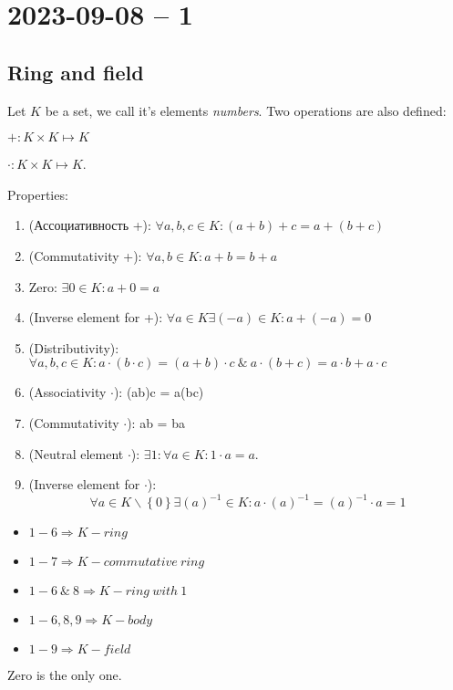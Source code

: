 \section{2023-09-08 -- 1}

\subsection{Ring and field}
Let $K$ be a set, we call it's elements \textit{numbers}. Two operations are also defined:

\(+: K \times K \mapsto K \) 

\(\cdot: K \times K \mapsto K\).

Properties:
\begin{enumerate}
	\item (Ассоциативность +): $\forall a,b,c \in K: (a+b)+c = a + (b+c)$ 
	\item (Commutativity +): $\forall a,b \in K: a + b = b + a$
	\item Zero: $\exists 0 \in K: a+0=a$
	\item (Inverse element for +): $\forall a \in K \exists (-a) \in K: a + (-a) = 0$ 
	\item (Distributivity): $\forall a,b,c \in K: a \cdot (b \cdot c) = (a+b) \cdot c \ \& \  a \cdot (b + c) = a \cdot b + a \cdot c$
	\item (Associativity $\cdot$): (ab)c = a(bc) 
	\item (Commutativity $\cdot$): ab = ba 
	\item (Neutral element $\cdot$): $\exists 1: \forall a \in K: 1 \cdot a = a$.
	\item (Inverse element for $\cdot$): \[
		\forall a \in K \backslash \left\{ 0 \right \} \exists (a)^{-1} \in K: a \cdot (a)^{-1} = (a)^{-1} \cdot a = 1
	\]
\end{enumerate}

\begin{itemize}
	\item $1 - 6 \Rightarrow K - ring$ 
	\item $1 - 7 \Rightarrow K - commutative \ ring$  
	\item $1 - 6 \ \& \ 8 \Rightarrow K - ring \ with \ 1$
	\item $1 - 6, 8, 9 \Rightarrow K - body$
	\item $1 - 9 \Rightarrow K - field$
\end{itemize}

\begin{property}[]
	Zero is the only one.
\end{property}

